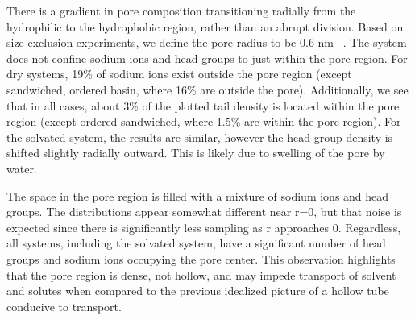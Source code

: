 \documentclass[journal=jpcbfk,manusciprt=article]{achemso}
\begin{document}
  There is a gradient in pore composition transitioning radially from the hydrophilic 
  to the hydrophobic region, rather than an abrupt division. Based on size-exclusion 
  experiments, we define the pore radius to be 0.6 nm
  ~\cite{zhou_supported_2005}. The system does not confine
  sodium ions and head groups to just within the pore region. For dry systems,
  19\% of sodium ions exist outside the pore region (except sandwiched, ordered basin,
  where 16\% are outside the pore). Additionally, we see that in all cases, about 
  3\% of the plotted tail density is located within the pore region (except ordered sandwiched,
  where 1.5\% are within the pore region). For the solvated system, the results are similar,
  however the head group density is shifted slightly radially outward. This is likely due to
  swelling of the pore by water. 
  

  The space in the pore region is filled with a mixture of sodium ions
  and head groups. The distributions appear somewhat different near r=0, but that noise 
  is expected since there is significantly less sampling as r approaches 0. Regardless, 
  all systems, including the solvated system, have a significant number of head groups 
  and sodium ions occupying the pore center. This observation highlights that the pore
  region is dense, not hollow, and may impede transport of solvent and solutes when
  compared to the previous idealized picture of a hollow tube conducive to transport.
  
\end{document}
